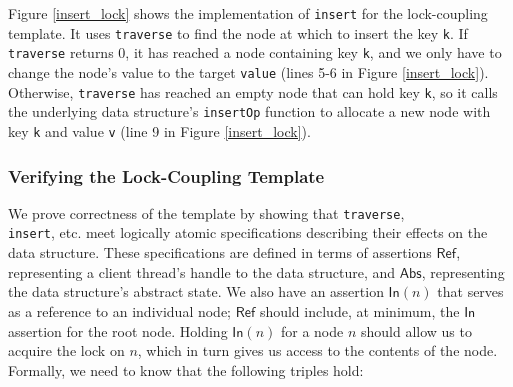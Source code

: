 \documentclass[sigplan,screen]{acmart}
\newcommand{\treerep}{\ensuremath{\mathsf{Abs}}}
\newcommand{\nodeboxrep}{\ensuremath{\mathsf{Ref }}}
\newcommand{\inFP}{\ensuremath{\mathsf{In }}}
\begin{document}

Figure \ref{insert_lock} shows the implementation of \lstinline{insert} for the lock-coupling template.
It uses \texttt{traverse} to find the node at which to insert the key \lstinline{k}. If \texttt{traverse} returns 0, it has reached a node containing key \texttt{k}, and we only have to change the node's value to the target \texttt{value} (lines 5-6 in Figure \ref{insert_lock}). Otherwise, \texttt{traverse} has reached an empty node that can hold key \texttt{k}, so it calls the underlying data structure's \texttt{insertOp} function to allocate a new node with key \texttt{k} and value \texttt{v} (line 9 in Figure \ref{insert_lock}).

\subsubsection{Verifying the Lock-Coupling Template}
\label{traverse_proof_lock}

We prove correctness of the template by showing that \lstinline{traverse}, \\ \lstinline{insert}, etc. meet logically atomic specifications describing their effects on the data structure. These specifications are defined in terms of assertions $\nodeboxrep$, representing a client thread's handle to the data structure, and $\treerep$, representing the data structure's abstract state. We also have an assertion $\inFP(n)$ that serves as a reference to an individual node; $\nodeboxrep$ should include, at minimum, the $\inFP$ assertion for the root node.
Holding $\inFP(n)$ for a node $n$ should allow us to acquire the lock on $n$, which in turn gives us access to the contents of the node. Formally, we need to know that the following triples hold:
\end{document}
